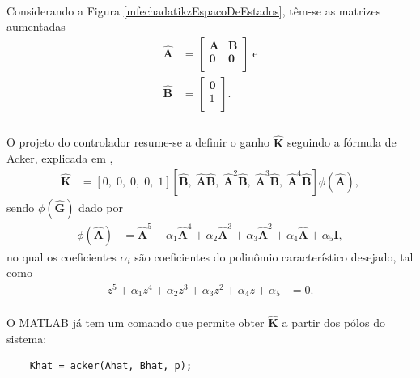 \paragraph{} Considerando a Figura \ref{mfechadatikzEspacoDeEstados}, têm-se as matrizes aumentadas \begin{align}
	\mathbf{\hat{A}} & = \left[\begin{array}{cc}
		\mathbf{A} & \mathbf{B}\\
		\mathbf{0} & \mathbf{0}\\
	\end{array}\right]\;\mathrm{e}\\
	\mathbf{\hat{B}} & = \left[\begin{array}{cc}
		\mathbf{0}\\
		1\\
	\end{array}\right].\\
\end{align}

\paragraph{} O projeto do controlador resume-se a definir o ganho $\mathbf{\hat{K}}$ seguindo a fórmula de Acker, explicada em \cite{OgataDiscrete:1995}, \begin{align}
	\mathbf{\hat{K}} & = \left[0,\; 0,\; 0,\; 0,\; 1\right]\left[\mathbf{\hat{B}},\; \mathbf{\hat{A}}\mathbf{\hat{B}},\; \mathbf{\hat{A}}^2\mathbf{\hat{B}},\; \mathbf{\hat{A}}^3\mathbf{\hat{B}},\; \mathbf{\hat{A}}^4\mathbf{\hat{B}}\right]\phi(\mathbf{\hat{A}}),
\end{align} sendo $\phi(\mathbf{\hat{G}})$ dado por \begin{align}
	\phi(\mathbf{\hat{A}}) &= \mathbf{\hat{A}}^5 + \alpha_1 \mathbf{\hat{A}}^4 + \alpha_2 \mathbf{\hat{A}}^3 + \alpha_3 \mathbf{\hat{A}}^2 + \alpha_4 \mathbf{\hat{A}} + \alpha_5 \mathbf{I},
\end{align} no qual os coeficientes $\alpha_i$ são coeficientes do polinômio característico desejado, tal como \begin{align}
	z^5 + \alpha_1 z^4 + \alpha_2 z^3 + \alpha_3 z^2 + \alpha_4 z + \alpha_5 & =0.
\end{align}

\paragraph{} O MATLAB já tem um comando que permite obter $\mathbf{\hat{K}}$ a partir dos pólos do sistema:\begin{lstlisting}
	Khat = acker(Ahat, Bhat, p);
\end{lstlisting}

